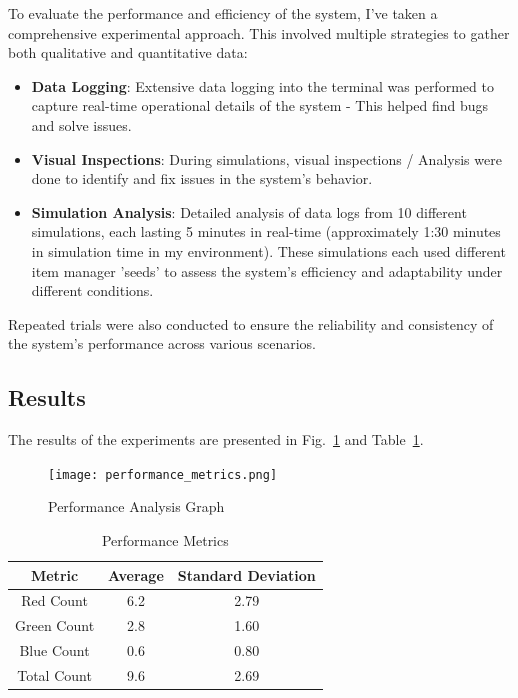 \documentclass[conference]{IEEEtran}
\begin{document}
To evaluate the performance and efficiency of the system, I've taken a comprehensive experimental approach. This involved multiple strategies to gather both qualitative and quantitative data:
\begin{itemize}
    \item \textbf{Data Logging}: Extensive data logging into the terminal was performed to capture real-time operational details of the system - This helped find bugs and solve issues.
    \item \textbf{Visual Inspections}: During simulations, visual inspections / Analysis were done to identify and fix issues in the system's behavior.
    \item \textbf{Simulation Analysis}: Detailed analysis of data logs from 10 different simulations, each lasting 5 minutes in real-time (approximately 1:30 minutes in simulation time in my environment). These simulations each used different item manager 'seeds' to assess the system's efficiency and adaptability under different conditions.
\end{itemize}
Repeated trials were also conducted to ensure the reliability and consistency of the system’s performance across various scenarios.


\subsection{Results}
The results of the experiments are presented in Fig.~\ref{fig:performancegraph} and Table~\ref{tab:performance}. 

\begin{figure}[htbp]
\centerline{\texttt{[image: performance\_metrics.png]}}
\caption{Performance Analysis Graph}
\label{fig:performancegraph}
\end{figure}

\begin{table}[htbp]
\caption{Performance Metrics}
\begin{center}
\begin{tabular}{|c|c|c|}
\hline
Metric & Average & Standard Deviation \\
\hline
Red Count & 6.2 & 2.79 \\
Green Count & 2.8 & 1.60 \\
Blue Count & 0.6 & 0.80 \\
Total Count & 9.6 & 2.69 \\
\hline
\end{tabular}
\label{tab:performance}
\end{center}
\end{table}
\end{document}
